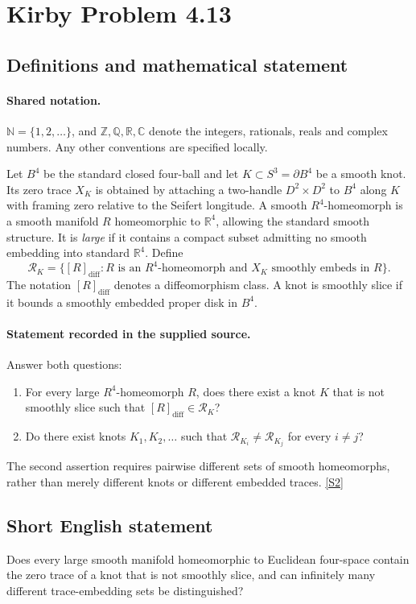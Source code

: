 \documentclass[11pt]{article}
\newcommand{\sref}[2]{\hyperlink{source:#1:#2}{[S#2]}}
\begin{document}
\section{Kirby Problem 4.13}\label{statement}

\subsection{Definitions and mathematical statement}

\paragraph{Shared notation.}$\mathbb N=\{1,2,\ldots\}$, and $\mathbb Z,\mathbb Q,\mathbb R,\mathbb C$ denote the integers, rationals, reals and complex numbers. Any other conventions are specified locally.


Let $B^4$ be the standard closed four-ball and let $K\subset S^3=\partial B^4$ be a smooth knot. Its zero trace $X_K$ is obtained by attaching a two-handle $D^2\times D^2$ to $B^4$ along $K$ with framing zero relative to the Seifert longitude. A smooth $R^4$-homeomorph is a smooth manifold $R$ homeomorphic to $\mathbb R^4$, allowing the standard smooth structure. It is \emph{large} if it contains a compact subset admitting no smooth embedding into standard $\mathbb R^4$. Define
\[
\mathcal R_K=\{[R]_{\mathrm{diff}}:R\text{ is an }R^4\text{-homeomorph and }X_K\text{ smoothly embeds in }R\}.
\]
The notation $[R]_{\mathrm{diff}}$ denotes a diffeomorphism class. A knot is smoothly slice if it bounds a smoothly embedded proper disk in $B^4$.
\paragraph{Statement recorded in the supplied source.}
Answer both questions:
\begin{enumerate}
\item[(a)] For every large $R^4$-homeomorph $R$, does there exist a knot $K$ that is not smoothly slice such that $[R]_{\mathrm{diff}}\in\mathcal R_K$?
\item[(b)] Do there exist knots $K_1,K_2,\ldots$ such that $\mathcal R_{K_i}\ne\mathcal R_{K_j}$ for every $i\ne j$?
\end{enumerate}
The second assertion requires pairwise different sets of smooth homeomorphs, rather than merely different knots or different embedded traces. \sref{statement}{2}
\subsection{Short English statement}
Does every large smooth manifold homeomorphic to Euclidean four-space contain the zero trace of a knot that is not smoothly slice, and can infinitely many different trace-embedding sets be distinguished?
\end{document}
